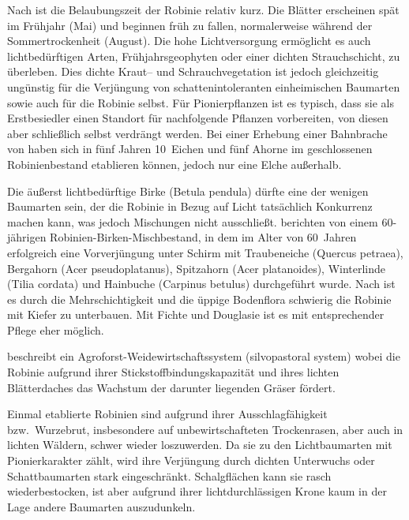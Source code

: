 \documentclass[twocolumn]{scrartcl}
\begin{document}
Nach \citet{vitkova2017robinie} ist die Belaubungszeit der Robinie
relativ kurz. Die Blätter erscheinen spät im Frühjahr (Mai) und
beginnen früh zu fallen, normalerweise während der Sommertrockenheit
(August). Die hohe Lichtversorgung ermöglicht es auch lichtbedürftigen
Arten, Frühjahrsgeophyten oder einer dichten Strauchschicht, zu
überleben. Dies dichte Kraut-- und Schrauchvegetation ist jedoch
gleichzeitig ungünstig für die Verjüngung von schattenintoleranten
einheimischen Baumarten sowie auch für die Robinie selbst. Für
Pionierpflanzen ist es typisch, dass sie als Erstbesiedler einen
Standort für nachfolgende Pflanzen vorbereiten, von diesen aber
schließlich selbst verdrängt werden. Bei einer Erhebung einer
Bahnbrache von \citet{kowarik1996robinie} haben sich in fünf Jahren
10~Eichen und fünf Ahorne im geschlossenen Robinienbestand etablieren
können, jedoch nur eine Elche außerhalb.

Die äußerst lichtbedürftige Birke (Betula pendula) dürfte eine der
wenigen Baumarten sein, der die Robinie in Bezug auf Licht tatsächlich
Konkurrenz machen kann, was jedoch Mischungen nicht
ausschließt. \citet{gaier2009robinieVorverjuengung} berichten von
einem 60-jährigen Robinien-Birken-Mischbestand, in dem im Alter von
60~Jahren erfolgreich eine Vorverjüngung unter Schirm mit Traubeneiche
(Quercus petraea), Bergahorn (Acer pseudoplatanus), Spitzahorn (Acer
platanoides), Winterlinde (Tilia cordata) und Hainbuche (Carpinus
betulus) durchgeführt wurde. Nach
\citet[S.~94]{erteld1952robinieErtrag} ist es durch die
Mehrschichtigkeit und die üppige Bodenflora schwierig die Robinie mit
Kiefer zu unterbauen. Mit Fichte und Douglasie ist es mit
entsprechender Pflege eher möglich.

\citet[p.\,467, 586]{ashton2018silviculture} beschreibt ein
Agroforst-Weidewirtschaftssystem (silvopastoral system) wobei die
Robinie aufgrund ihrer Stickstoffbindungskapazität und ihres lichten
Blätterdaches das Wachstum der darunter liegenden Gräser fördert.

Einmal etablierte Robinien sind aufgrund ihrer Ausschlagfähigkeit
bzw.\ Wurzebrut, insbesondere auf unbewirtschafteten Trockenrasen, aber
auch in lichten Wäldern, schwer wieder loszuwerden. Da sie zu den
Lichtbaumarten mit Pionierkarakter zählt, wird ihre Verjüngung durch
dichten Unterwuchs oder Schattbaumarten stark
eingeschränkt. Schalgflächen kann sie rasch wiederbestocken, ist aber
aufgrund ihrer lichtdurchlässigen Krone kaum in der Lage andere
Baumarten auszudunkeln.
\end{document}
